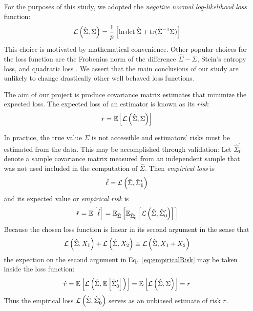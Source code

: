For the purposes of this study, we adopted the \emph{negative normal log-likelihood loss} function:
\begin{equation}\label{eq:loss}
\mathcal L\left(\hat\Sigma,\Sigma\right) = \frac 1 p\left[\ln \det \hat \Sigma + \operatorname{tr}(\hat \Sigma^{-1}\Sigma)\right]
\end{equation}
This choice is motivated by mathematical convenience. Other popular choices for the loss function are the Frobenius norm of the difference $\hat\Sigma-\Sigma$, Stein's entropy loss, and quadratic loss \cite{James:1961,Ledoit:2004,Schafer:2005,Fan:2008}.  We assert that the main conclusions of our study are unlikely to change drastically other well behaved loss functions.

The aim of our project is produce covariance matrix estimates that minimize the expected loss.  The expected loss of an estimator is known as its \emph{risk}: 
\begin{equation}
r = \mathbb E\left[ \mathcal L\left(\hat\Sigma, \Sigma\right)\right]
\end{equation}

In practice, the true value $\Sigma$ is not accessible and estimators' risks must be estimated from the data.  This may be accomplished through validation: 
Let $\hat\Sigma_0^\prime$ denote a sample covariance matrix measured from an independent sample that was not used included in the computation of $\hat\Sigma$. Then \emph{empirical loss} is 
\begin{equation}
\hat \ell = \mathcal L\left(\hat\Sigma,\hat\Sigma_0^\prime\right)
\end{equation}
 and its expected value or \emph{empirical risk} is
\begin{equation}\label{eq:empiricalRisk}
\hat r = \mathbb E\left[ \hat\ell\right] = \mathbb E_{\hat\Sigma} \left[ \mathbb E_{\hat\Sigma_0^\prime} \left[ {\mathcal L\left(\hat\Sigma,\hat\Sigma_0^\prime\right)} \right] \right]
\end{equation}
Because the chosen loss function is linear in its second argument in the sense that
\begin{equation}
\mathcal L\left(\hat\Sigma,X_1\right) + \mathcal L\left(\hat\Sigma,X_2\right) \equiv \mathcal L\left(\hat\Sigma,X_1+X_2\right)
\end{equation}
the expection on the second argument in Eq.~\ref{eq:empiricalRisk} may be taken inside the loss function:
\begin{equation}
\hat r = \mathbb E\left[ \mathcal L\left(\hat\Sigma,\mathbb E\left[ \hat\Sigma_0^\prime\right]\right)\right]  = \mathbb E\left[ \mathcal L\left(\hat\Sigma,\Sigma\right)\right] = r
\end{equation}
Thus the empirical loss $\mathcal L\left(\hat \Sigma,\hat \Sigma_0^\prime\right)$ serves as an unbiased estimate of risk $r$. 

